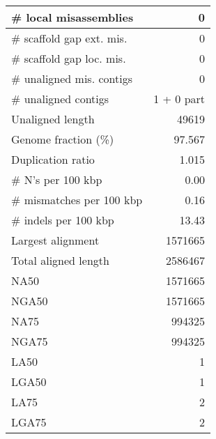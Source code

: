 \documentclass[12pt,a4paper]{article}
\begin{document}
\begin{table}[ht]
\begin{center}
\begin{tabular}{|l*{1}{|r}|}
\# local misassemblies & 0 \\ \hline
\# scaffold gap ext. mis. & 0 \\ \hline
\# scaffold gap loc. mis. & 0 \\ \hline
\# unaligned mis. contigs & 0 \\ \hline
\# unaligned contigs & 1 + 0 part \\ \hline
Unaligned length & 49619 \\ \hline
Genome fraction (\%) & 97.567 \\ \hline
Duplication ratio & 1.015 \\ \hline
\# N's per 100 kbp & 0.00 \\ \hline
\# mismatches per 100 kbp & 0.16 \\ \hline
\# indels per 100 kbp & 13.43 \\ \hline
Largest alignment & 1571665 \\ \hline
Total aligned length & 2586467 \\ \hline
NA50 & 1571665 \\ \hline
NGA50 & 1571665 \\ \hline
NA75 & 994325 \\ \hline
NGA75 & 994325 \\ \hline
LA50 & 1 \\ \hline
LGA50 & 1 \\ \hline
LA75 & 2 \\ \hline
LGA75 & 2 \\ \hline
\end{tabular}
\end{center}
\end{table}
\end{document}
